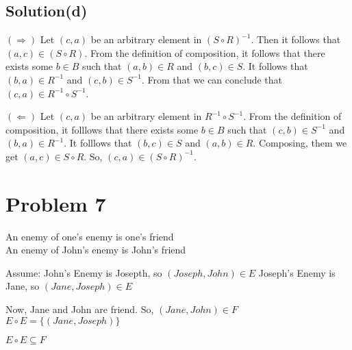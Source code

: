 \documentclass{article}
\begin{document}
\subsection{Solution(d)}
\noindent

$(\Rightarrow)$ Let $(c,a)$ be an arbitrary element in $(S \circ
R)^{-1}$. Then it follows that $(a,c) \in (S \circ R)$. From the
definition of composition, it follows that there exists some $b \in B$
such that $(a,b) \in R$ and $(b,c) \in S$. It follows that $(b,a) \in
R^{-1}$ and $(c,b) \in S^{-1}$. From that we can conclude that $(c,a)
\in R^{-1} \circ S^{-1}$.

$(\Leftarrow)$ Let $(c,a)$ be an arbitrary element in $R^{-1} \circ
S^{-1}$. From the definition of composition, it folllows that there
exists some $b \in B$ such that $(c,b) \in S^{-1}$ and $(b,a) \in
R^{-1}$. It folllows that $(b,c) \in S$ and $(a,b) \in R$. Composing,
them we get $(a,c) \in S \circ R$. So, $(c,a) \in (S \circ R)^{-1}$.

\section{Problem 7}

An enemy of one's enemy is one's friend \\
An enemy of John's enemy is John's friend

Assume: John's Enemy is Josepth, so $(Joseph, John) \in E$
Joseph's Enemy is Jane, so $(Jane, Joseph) \in E$

Now, Jane and John are friend. So, $(Jane, John) \in F$
$E \circ E = \{(Jane, Joseph)\}$

$E \circ E \subseteq F$
\end{document}
